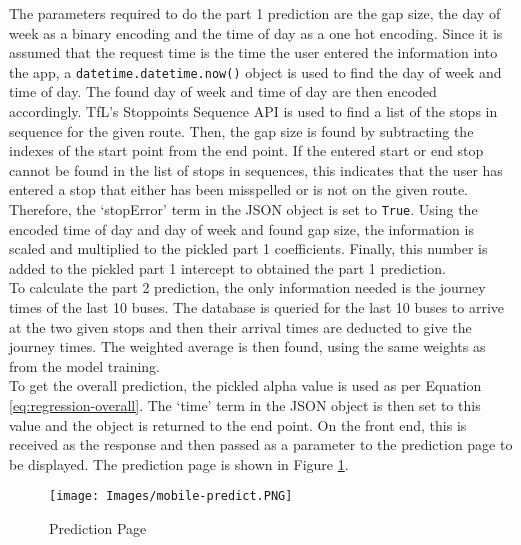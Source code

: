 The parameters required to do the part 1 prediction are the gap size, the day of week as a binary encoding and the time of day as a one hot encoding. Since it is assumed that the request time is the time the user entered the information into the app, a \texttt{datetime.datetime.now()} object is used to find the day of week and time of day. The found day of week and time of day are then encoded accordingly. TfL's Stoppoints Sequence API is used to find a list of the stops in sequence for the given route. Then, the gap size is found by subtracting the indexes of the start point from the end point. If the entered start or end stop cannot be found in the list of stops in sequences, this indicates that the user has entered a stop that either has been misspelled or is not on the given route. Therefore, the `stopError' term in the JSON object is set to \texttt{True}. Using the encoded time of day and day of week and found gap size, the information is scaled and multiplied to the pickled part 1 coefficients. Finally, this number is added to the pickled part 1 intercept to obtained the part 1 prediction. \\

To calculate the part 2 prediction, the only information needed is the journey times of the last 10 buses. The database is queried for the last 10 buses to arrive at the two given stops and then their arrival times are deducted to give the journey times. The weighted average is then found, using the same weights as from the model training. \\

To get the overall prediction, the pickled alpha value is used as per Equation \ref{eq:regression-overall}. The `time' term in the JSON object is then set to this value and the object is returned to the end point. On the front end, this is received as the response and then passed as a parameter to the prediction page to be displayed. The prediction page is shown in Figure \ref{fig:mobile-predict-page}.

\begin{figure}[H]
\begin{center}
    \texttt{[image: Images/mobile-predict.PNG]}
    \caption{Prediction Page}
    \label{fig:mobile-predict-page}
\end{center}
\end{figure}

\clearpage